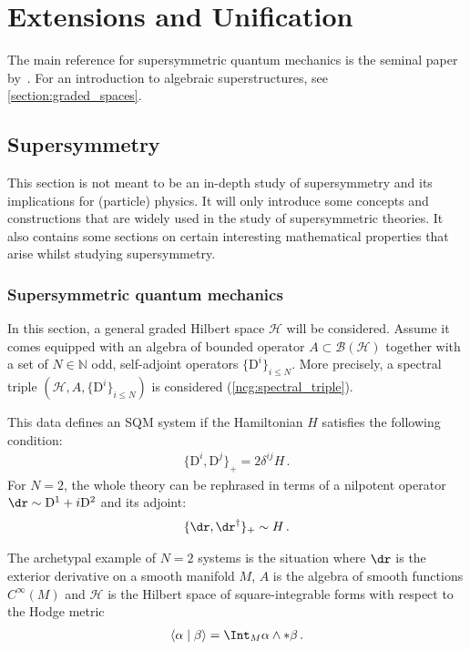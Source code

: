 \chapter{Extensions and Unification}\label{chapter:unification}

    The main reference for supersymmetric quantum mechanics is the seminal paper by~\citet{witten_supersymmetry_1982}. For an introduction to algebraic superstructures, see \cref{section:graded_spaces}.

    \minitoc

\section{Supersymmetry}

    This section is not meant to be an in-depth study of supersymmetry and its implications for (particle) physics. It will only introduce some concepts and constructions that are widely used in the study of supersymmetric theories. It also contains some sections on certain interesting mathematical properties that arise whilst studying supersymmetry.

\subsection{Supersymmetric quantum mechanics}

    In this section, a general graded Hilbert space $\mathcal{H}$ will be considered. Assume it comes equipped with an algebra of bounded operator $A\subset\mathcal{B}(\mathcal{H})$ together with a set of $N\in\mathbb{N}$ odd, self-adjoint operators $\{\mathrm{D}^i\}_{i\leq N}$. More precisely, a spectral triple $(\mathcal{H},A,\{\mathrm{D}^i\}_{i\leq N})$ is considered (\cref{ncg:spectral_triple}).

    This data defines an SQM system if the Hamiltonian $H$ satisfies the following condition:
    \begin{gather}
        \{\mathrm{D}^i,\mathrm{D}^j\}_+ = 2\delta^{ij}H\,.
    \end{gather}
    For $N=2$, the whole theory can be rephrased in terms of a nilpotent operator $\dr\sim \mathrm{D}^1+i\mathrm{D}^2$ and its adjoint:
    \begin{gather}
        \{\dr,\dr^\dagger\}_+\sim H\,.
    \end{gather}

    \begin{example}
        The archetypal example of $N=2$ systems is the situation where $\dr$ is the exterior derivative on a smooth manifold $M$, $A$ is the algebra of smooth functions $C^\infty(M)$ and $\mathcal{H}$ is the Hilbert space of square-integrable forms with respect to the Hodge metric
        \begin{gather}
            \langle\alpha\mid\beta\rangle = \Int_M\alpha\wedge\ast\beta\,.
        \end{gather}
    \end{example}

